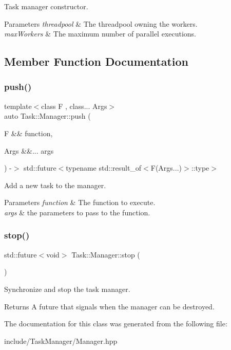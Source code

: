 Task manager constructor. 
\begin{DoxyParams}{Parameters}
{\em threadpool} & The threadpool owning the workers. \\
\hline
{\em max\+Workers} & The maximum number of parallel executions. \\
\hline
\end{DoxyParams}


\subsection{Member Function Documentation}
\mbox{\label{classTask_1_1Manager_a07c1fcc7d584edfab6407df34bcef8f9}} 
\subsubsection{\texorpdfstring{push()}{push()}}
{\footnotesize\ttfamily template$<$class F , class... Args$>$ \\
auto Task\+::\+Manager\+::push (\begin{DoxyParamCaption}\item[{F \&\&}]{function,  }\item[{Args \&\&...}]{args }\end{DoxyParamCaption}) -\/$>$ std\+::future$<$typename std\+::result\+\_\+of$<$F(Args...)$>$\+::type$>$ \hspace{0.3cm}{\ttfamily [inline]}}

Add a new task to the manager. 
\begin{DoxyParams}{Parameters}
{\em function} & The function to execute. \\
\hline
{\em args} & the parameters to pass to the function. \\
\hline
\end{DoxyParams}
\mbox{\label{classTask_1_1Manager_adc748804a61954b13a3baab6c81331f3}} 
\subsubsection{\texorpdfstring{stop()}{stop()}}
{\footnotesize\ttfamily std\+::future$<$void$>$ Task\+::\+Manager\+::stop (\begin{DoxyParamCaption}{ }\end{DoxyParamCaption})}

Synchronize and stop the task manager. \begin{DoxyReturn}{Returns}
A future that signals when the manager can be destroyed. 
\end{DoxyReturn}


The documentation for this class was generated from the following file\+:\begin{DoxyCompactItemize}
\item 
include/\+Task\+Manager/Manager.\+hpp\end{DoxyCompactItemize}

